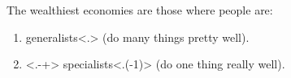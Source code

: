 \documentclass[12pt,t]{beamer}
\begin{document}
    
    \begin{frame}
        The wealthiest economies are those where people are:

        \begin{enumerate}
          \item<+> generalists\only<.>{ (do many things pretty well)}.
          \item<.-+> specialists\only<.(-1)>{ (do one thing really well)}.
        \end{enumerate}
    \end{frame}
\end{document}
